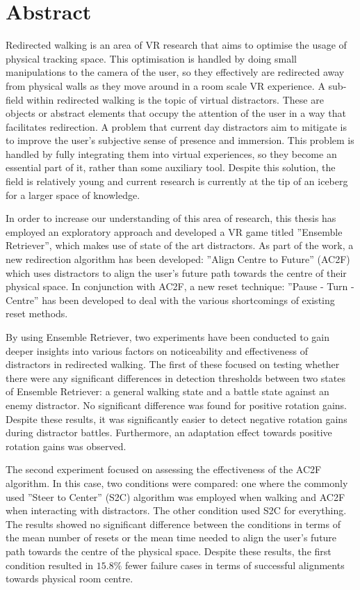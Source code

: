 \chapter*{Abstract}
Redirected walking is an area of VR research that aims to optimise the usage of physical tracking space. This optimisation is handled by doing small manipulations to the camera of the user, so they effectively are redirected away from physical walls as they move around in a room scale VR experience.
A sub-field within redirected walking is the topic of virtual distractors. These are objects or abstract elements that occupy the attention of the user in a way that facilitates redirection. A problem that current day distractors aim to mitigate is to improve the user's subjective sense of presence and immersion. This problem is handled by fully integrating them into virtual experiences, so they become an essential part of it, rather than some auxiliary tool. Despite this solution, the field is relatively young and current research is currently at the tip of an iceberg for a larger space of knowledge. 

In order to increase our understanding of this area of research, this thesis has employed an exploratory approach and developed a VR game titled ''Ensemble Retriever'', which makes use of state of the art distractors. As part of the work, a new redirection algorithm has been developed: ''Align Centre to Future'' (AC2F) which uses distractors to align the user's future path towards the centre of their physical space. In conjunction with AC2F, a new reset technique: ''Pause - Turn - Centre'' has been developed to deal with the various shortcomings of existing reset methods. 

By using Ensemble Retriever, two experiments have been conducted to gain deeper insights into various factors on noticeability and effectiveness of distractors in redirected walking. The first of these focused on testing whether there were any significant differences in detection thresholds between two states of Ensemble Retriever: a general walking state and a battle state against an enemy distractor. No significant difference was found for positive rotation gains. Despite these results, it was significantly easier to detect negative rotation gains during distractor battles. Furthermore, an adaptation effect towards positive rotation gains was observed. 

The second experiment focused on assessing the effectiveness of the AC2F algorithm. In this case, two conditions were compared: one where the commonly used ''Steer to Center'' (S2C) algorithm was employed when walking and AC2F when interacting with distractors. The other condition used S2C for everything. The results showed no significant difference between the conditions in terms of the mean number of resets or the mean time needed to align the user's future path towards the centre of the physical space. Despite these results, the first condition resulted in $15.8\%$ fewer failure cases in terms of successful alignments towards physical room centre. 

